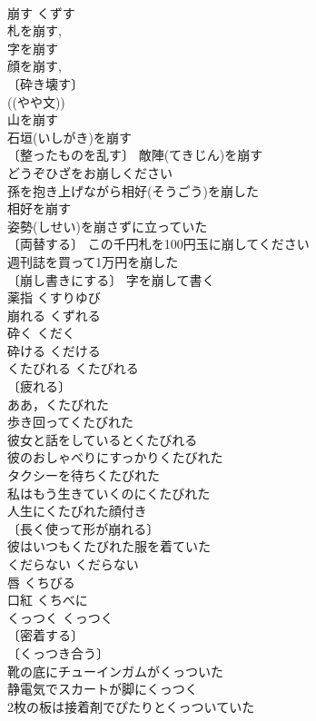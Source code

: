 \documentclass[8pt]{extreport}
\begin{document}
\begin{CJK}{UTF8}{min}
\\	崩す	くずす	
\\	札を崩す, 
\\	字を崩す 
\\	顔を崩す, 
\\	〔砕き壊す〕
\\	((やや文)) 
\\	山を崩す 
\\	石垣(いしがき)を崩す 
\\	〔整ったものを乱す〕 敵陣(てきじん)を崩す 
\\	どうぞひざをお崩しください 
\\	孫を抱き上げながら相好(そうごう)を崩した 
\\	相好を崩す 
\\	姿勢(しせい)を崩さずに立っていた 
\\	〔両替する〕 この千円札を100円玉に崩してください 
\\	週刊誌を買って1万円を崩した 
\\	〔崩し書きにする〕 字を崩して書く 
\\	薬指	くすりゆび	
\\	崩れる	くずれる	
\\	砕く	くだく	
\\	砕ける	くだける	
\\	くたびれる	くたびれる	
\\	〔疲れる〕
\\	ああ，くたびれた 
\\	歩き回ってくたびれた 
\\	彼女と話をしているとくたびれる 
\\	彼のおしゃべりにすっかりくたびれた 
\\	タクシーを待ちくたびれた 
\\	私はもう生きていくのにくたびれた 
\\	人生にくたびれた顔付き 
\\	〔長く使って形が崩れる〕
\\	彼はいつもくたびれた服を着ていた 
\\	くだらない	くだらない	
\\	唇	くちびる	
\\	口紅	くちべに	
\\	くっつく	くっつく	
\\	〔密着する〕
\\	〔くっつき合う〕
\\	靴の底にチューインガムがくっついた 
\\	静電気でスカートが脚にくっつく 
\\	2枚の板は接着剤でぴたりとくっついていた 

\end{CJK}
\end{document}
